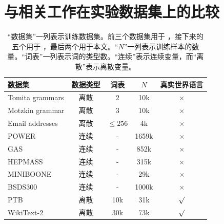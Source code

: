 \documentclass{article}
\theoremstyle{plain}
\theoremstyle{definition}
\theoremstyle{remark}
\begin{document}
\section{与相关工作在实验数据集上的比较}
\label{sec:datasets}
\begin{table}[t]
    \centering
    \begin{tabular}{l|c|c|c|c}
    \toprule
        数据集 & 数据类型 & 词表  & $N$ & 真实世界语言  \\
         \midrule
        Tomita grammars  \cite{tomita1982dynamic}  & 离散 & 2  & 10k & $\times$ \\
        Motzkin grammar \citep{alexander2021exact} & 离散 & 3 & 10k   &$\times$ \\
         Email addresses \citep{radev2008clair} & 离散 & $\leq 256$ & 4k & $\times$  \\
        \midrule
        POWER  \cite{Dua:2019} & 连续 & - & 1659k & $\times$ \\
        GAS \cite{fonollosa2015reservoir} & 连续 & - & 852k &  $\times$ \\
        HEPMASS \cite{baldi2016parameterized} & 连续 & - & 315k & $\times$  \\
        MINIBOONE \cite{roe2005boosted} & 连续 & -  & 29k & $\times$  \\
        BSDS300 \citep{martin2001database}  & 连续 & - & 1000k &  $\times$ \\

        \midrule
        PTB \citep{marcinkiewicz1994building} & 离散 & 10k  & 31k & $\surd$ \\
        WikiText-2  \citep{merity2016pointer} & 离散 & 30k & 73k &  $\surd$ \\

 \bottomrule
    \end{tabular}
    \caption{“数据集”一列表示训练数据集。前三个数据集用于 \citep{miller2021tensor}，接下来的五个用于 \cite{novikov2021tensor}，最后两个用于本文。“$N$”一列表示训练样本的数量。“词表”一列表示词的类型数。“连续”表示连续变量，而“离散”表示离散变量。}
    \label{tab:datasets}
\end{table}
\end{document}
